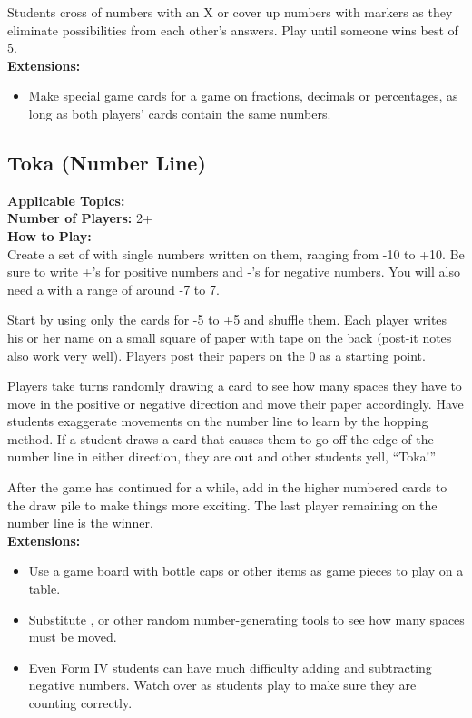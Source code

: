 	Students cross of numbers with an X or cover up numbers with markers as they eliminate possibilities from each other's answers. Play until someone wins best of 5.\\
	
	\noindent \textbf{Extensions:}
	\begin{itemize}
	\item Make special game cards for a game on fractions, decimals or percentages, as long as both players' cards contain the same numbers.
	\end{itemize}
	
	\subsection{Toka (Number Line)} \label{toka}
	\textbf{Applicable Topics:} \\	
	\textbf{Number of Players:} 2+\\
	
	\noindent \textbf{How to Play:}\\
	Create a set of  with single numbers written on them, ranging from -10 to +10. Be sure to write +'s for positive numbers and -'s for negative numbers. You will also need a  with a range of around -7 to 7.
	
	Start by using only the cards for -5 to +5 and shuffle them. Each player writes his or her name on a small square of paper with tape on the back (post-it notes also work very well). Players post their papers on the 0 as a starting point. 
	
	Players take turns randomly drawing a card to see how many spaces they have to move in the positive or negative direction and move their paper accordingly. Have students exaggerate movements on the number line	to learn by the hopping method. If a student draws a card that causes them to go off the edge of the number line in either direction, they are out and other students yell, ``Toka!''
	
	After the game has continued for a while, add in the higher numbered cards to the draw pile to make things more exciting. The last player remaining on the number line is the winner.\\
	
	\noindent \textbf{Extensions:}
	\begin{itemize}
	\item Use a game board with bottle caps or other items as game pieces to play on a table.
	\item Substitute ,  or other random number-generating tools to see how many spaces must be moved.
	\item Even Form IV students can have much difficulty adding and subtracting negative numbers. Watch over as students play to make sure they are counting correctly.
	\end{itemize}
	
